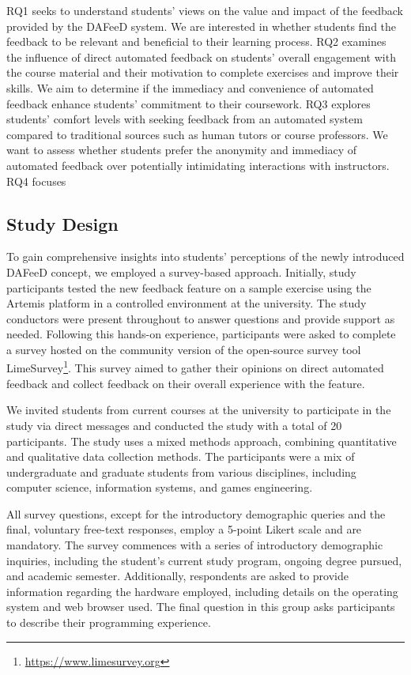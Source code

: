 \documentclass[manuscript,screen,review]{acmart}
\begin{document}

RQ1 seeks to understand students' views on the value and impact of the feedback provided by the DAFeeD system. 
We are interested in whether students find the feedback to be relevant and beneficial to their learning process.
RQ2 examines the influence of direct automated feedback on students' overall engagement with the course material and their motivation to complete exercises and improve their skills.
We aim to determine if the immediacy and convenience of automated feedback enhance students' commitment to their coursework.
RQ3 explores students' comfort levels with seeking feedback from an automated system compared to traditional sources such as human tutors or course professors. 
We want to assess whether students prefer the anonymity and immediacy of automated feedback over potentially intimidating interactions with instructors.
RQ4 focuses 

\subsection{Study Design}
To gain comprehensive insights into students' perceptions of the newly introduced DAFeeD concept, we employed a survey-based approach.
Initially, study participants tested the new feedback feature on a sample exercise using the Artemis platform in a controlled environment at the university.
The study conductors were present throughout to answer questions and provide support as needed.
Following this hands-on experience, participants were asked to complete a survey hosted on the community version of the open-source survey tool LimeSurvey\footnote{\url{https://www.limesurvey.org}}.
This survey aimed to gather their opinions on direct automated feedback and collect feedback on their overall experience with the feature.

We invited students from current courses at the university to participate in the study via direct messages and conducted the study with a total of 20 participants.
The study uses a mixed methods approach, combining quantitative and qualitative data collection methods. 
The participants were a mix of undergraduate and graduate students from various disciplines, including computer science, information systems, and games engineering.

All survey questions, except for the introductory demographic queries and the final, voluntary free-text responses, employ a 5-point Likert scale \cite{allen:2007:LikertScalesData} and are mandatory.
The survey commences with a series of introductory demographic inquiries, including the student's current study program, ongoing degree pursued, and academic semester. 
Additionally, respondents are asked to provide information regarding the hardware employed, including details on the operating system and web browser used.
The final question in this group asks participants to describe their programming experience.
\end{document}
